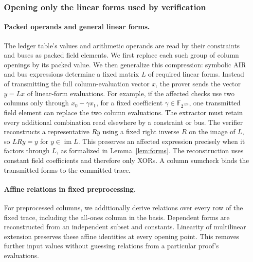 \documentclass[11pt]{article}
\newcommand{\F}{\mathbb{F}_{2^{128}}}
\newcommand{\XOR}{\textsf{XOR}}
\begin{document}
\subsubsection{Opening only the linear forms used by verification}

\paragraph{Packed operands and general linear forms.} The ledger table's values
and arithmetic operands are read by their constraints and buses as packed
field elements. We first replace each such group of column openings by its
packed value. We then generalize this compression: symbolic AIR and bus
expressions determine a fixed matrix $L$ of required linear forms. Instead
of transmitting the full column-evaluation vector $x$, the prover sends
the vector $y=Lx$ of linear-form evaluations. For example, if the affected
checks use two columns only through $x_0+\gamma x_1$, for a fixed
coefficient $\gamma\in\F$, one transmitted field element can replace the
two column evaluations. The extractor must retain every additional
combination read elsewhere by a constraint or bus.
The verifier reconstructs a representative $Ry$ using a fixed right inverse
$R$ on the image of $L$, so $LRy=y$ for $y\in\operatorname{im}L$.
This preserves an affected expression precisely when it factors
through $L$, as formalized in Lemma~\ref{lem:forms}. The reconstruction uses
constant field coefficients and therefore only \XOR{}s. A column sumcheck
binds the transmitted forms to the committed trace.

\paragraph{Affine relations in fixed preprocessing.} For preprocessed
columns, we additionally derive relations over every row of the fixed
trace, including the all-ones column in the basis. Dependent forms are
reconstructed from an independent subset and constants. Linearity of
multilinear extension preserves these affine identities at every opening
point. This removes further input values without guessing relations from
a particular proof's evaluations.
\end{document}
